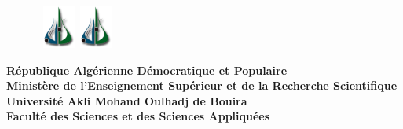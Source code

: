 \begin{titlepage}

\begin{figure}[htbp]
 \hbox{
     \includegraphics[width=40px]{Imag/logo.png}
     \hspace*{12.5cm}
     \includegraphics[width=40px]{Imag/logo.png}
  }
\end{figure}

\vspace {-1.8cm}

\begin{center}
{\bf R\'{e}publique Alg\'{e}rienne D\'emocratique et Populaire\\
	\vspace{0.3cm}
Minist\`{e}re de l'Enseignement Sup\'{e}rieur et de la
Recherche Scientifique} \vspace{0.2cm}\\

{\bf {\large Université Akli Mohand Oulhadj de Bouira}}\\

{\bf Facult\'{e} des Sciences et des Sciences Appliquées} \\


\end{center}
\end{titlepage}
